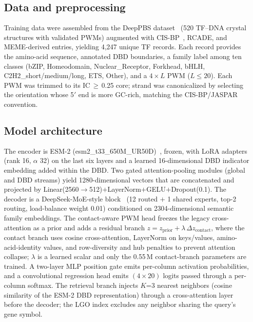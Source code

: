 \documentclass[11pt,letterpaper]{article}
\begin{document}
\subsection*{Data and preprocessing}
Training data were assembled from the DeepPBS dataset~\cite{Mitra2024} (520
TF--DNA crystal structures with validated PWMs) augmented with
CIS-BP~\cite{Weirauch2014}, RCADE, and MEME-derived entries, yielding 4,247 unique
TF records. Each record provides the amino-acid sequence, annotated DBD boundaries,
a family label among ten classes (bZIP, Homeodomain, Nuclear\_Receptor, Forkhead,
bHLH, C2H2\_short/medium/long, ETS, Other), and a $4\times L$ PWM ($L\leq20$). Each
PWM was trimmed to its IC\,$\geq$\,0.25 core; strand was canonicalized by selecting
the orientation whose 5$'$ end is more GC-rich, matching the
CIS-BP/JASPAR~\cite{CastroMondragon2022} convention.

\subsection*{Model architecture}
The encoder is ESM-2 (esm2\_t33\_650M\_UR50D)~\cite{Lin2023}, frozen, with LoRA
adapters (rank 16, $\alpha$ 32) on the last six layers and a learned 16-dimensional
DBD indicator embedding added within the DBD. Two gated attention-pooling modules
(global and DBD streams) yield 1280-dimensional vectors that are concatenated and
projected by Linear(2560$\to$512)$+$LayerNorm$+$GELU$+$Dropout(0.1). The decoder is
a DeepSeek-MoE-style block~\cite{Dai2024} (12 routed $+$ 1 shared experts, top-2
routing, load-balance weight 0.01) conditioned on 2304-dimensional semantic family
embeddings. The contact-aware PWM head freezes the legacy cross-attention as a prior
and adds a residual branch
$z = z_{\mathrm{prior}} + \lambda\,\Delta z_{\mathrm{contact}}$, where the contact
branch uses cosine cross-attention, LayerNorm on keys/values, amino-acid-identity
values, and row-diversity and hub penalties to prevent attention collapse;
$\lambda$ is a learned scalar and only the 0.55\,M contact-branch parameters are
trained. A two-layer MLP position gate emits per-column activation probabilities,
and a convolutional regression head emits $(4\times20)$ logits passed through a
per-column softmax. The retrieval branch injects $K$=3 nearest neighbors (cosine
similarity of the ESM-2 DBD representation) through a cross-attention layer before
the decoder; the LGO index excludes any neighbor sharing the query's gene symbol.
\end{document}
